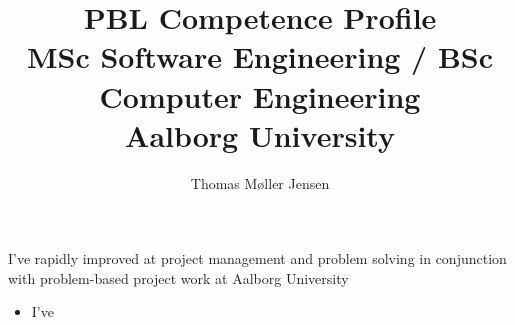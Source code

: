 \documentclass[a4paper]{article}
\title{\large PBL Competence Profile\\\small MSc Software Engineering / BSc Computer Engineering \\ Aalborg University}
\author{Thomas Møller Jensen}
\newcommand{\myitem}{\item[\color{red}\#]}
\begin{document}
    \maketitle
    I've rapidly improved at project management and problem solving in conjunction with problem-based project work at Aalborg University
    \begin{itemize}
        \myitem{} I've
    \end{itemize}
    
\end{document}
